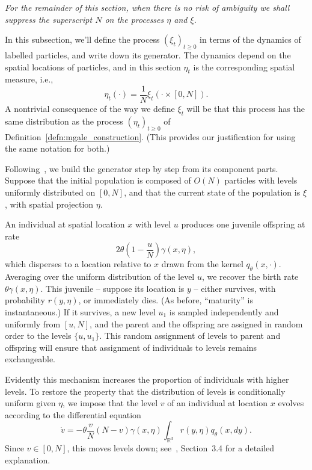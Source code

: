 \documentclass[12pt]{article}
\newcommand{\IR}{\mathbb R}
\newcommand{\lp}{\xi}              %
\numberwithin{equation}{section}
\begin{document}
{\em For the remainder of this section, when there is no risk of ambiguity we shall
suppress the superscript $N$ on the processes $\eta$ and $\xi$.}

In this subsection,
we'll define the process $(\lp_t)_{t \ge 0}$ in terms of the 
dynamics of labelled particles,
and write down its generator.
The dynamics depend on the spatial locations of particles,
and in this section $\eta_t$ is the corresponding spatial measure,
i.e.,
$$
    \eta_t(\cdot) = \frac{1}{N} \lp_t(\cdot \times [0, N])  .
$$
A nontrivial consequence of the way we define $\lp_t$ will be that
this process has the same distribution as the process $(\eta_t)_{t \ge 0}$ 
of Definition~\ref{defn:mgale_construction}.
(This provides our justification for using the same notation for both.)


Following~\cite{etheridge/kurtz:2019}, we build the generator step by step
from its 
component parts. 
Suppose that the initial population is composed of $O(N)$ particles
with levels uniformly distributed on $[0, N]$,
and that the current state of the population is $\lp$,
with spatial projection $\eta$.

An individual at spatial location $x$ with level $u$
produces one juvenile offspring at rate 
$$
2 \theta \left(1 - \frac{u}{N}\right) \gamma(x, \eta) ,
$$
which disperses to a location relative to $x$ drawn 
from the kernel $q_{\theta}(x, \cdot)$.
Averaging over the uniform distribution of the level $u$,
we recover the birth rate $\theta\gamma(x, \eta)$.
This juvenile -- suppose its location is $y$ --
either survives, with probability $r(y, \eta)$, or immediately dies.
(As before, ``maturity'' is instantaneous.)
If it survives, 
a new level $u_1$ is sampled independently and uniformly from $[u,N]$,
and the parent and the offspring are assigned in random order to the 
levels $\{u, u_1\}$.
This random assignment of levels to parent
and offspring will ensure that assignment of individuals to levels remains exchangeable.

Evidently this mechanism increases the proportion
of individuals with higher levels.
To restore the property that
the distribution of levels is conditionally uniform
given $\eta$,
we impose that 
the level $v$ of an individual at location $x$
evolves according to the differential equation
$$
    \dot{v}
    =
    -\theta \frac{v}{N} \left(N - v\right)
    \gamma(x, \eta) \int_{\IR^d} r(y, \eta) q_\theta(x, dy) .
$$
Since $v \in [0, N]$, this moves levels down;
see~\cite{etheridge/kurtz:2019}, Section~3.4 for a detailed explanation.
\end{document}
